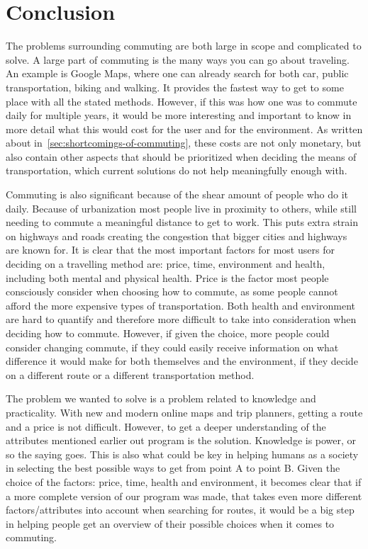 \chapter{Conclusion}\label{ch:conclusion}
The problems surrounding commuting are both large in scope and complicated to solve.
A large part of commuting is the many ways you can go about traveling.
An example is Google Maps, where one can already search for both car, public transportation, biking and walking.
It provides the fastest way to get to some place with all the stated methods.
However, if this was how one was to commute daily for multiple years, it would be more interesting and important to know
in more detail what this would cost for the user and for the environment.
As written about in~\ref{sec:shortcomings-of-commuting}, these costs are not only monetary, but also contain other
aspects that should be prioritized when deciding the means of transportation, which current solutions do not help
meaningfully enough with.

Commuting is also significant because of the shear amount of people who do it daily.
Because of urbanization most people live in proximity to others, while still needing to commute a meaningful distance to
get to work.
This puts extra strain on highways and roads creating the congestion that bigger cities and highways are known for.
It is clear that the most important factors for most users for deciding on a travelling method are: price, time,
environment and health, including both mental and physical health.
Price is the factor most people consciously consider when choosing how to commute, as some people cannot afford the
more expensive types of transportation.
Both health and environment are hard to quantify and therefore more difficult to take into consideration when deciding
how to commute.
However, if given the choice, more people could consider changing commute, if they could easily receive information on
what difference it would make for both themselves and the environment, if they decide on a different route or a
different transportation method.

The problem we wanted to solve is a problem related to knowledge and practicality.
With new and modern online maps and trip planners, getting a route and a price is not difficult.
However, to get a deeper understanding of the attributes mentioned earlier out program is the solution.
Knowledge is power, or so the saying goes.
This is also what could be key in helping humans as a society in selecting the best possible ways to get from point A to
point B\@.
Given the choice of the factors: price, time, health and environment, it becomes clear that if a more complete version
of our program was made, that takes even more different factors/attributes into account when searching for routes, it
would be a big step in helping people get an overview of their possible choices when it comes
to commuting.
